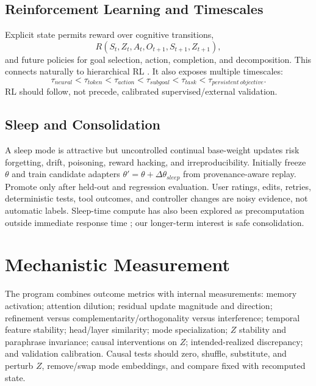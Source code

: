 \documentclass[11pt]{article}
\begin{document}
\subsection{Reinforcement Learning and Timescales}
Explicit state permits reward over cognitive transitions,
\begin{equation}
R(S_t,Z_t,A_t,O_{t+1},S_{t+1},Z_{t+1}),
\end{equation}
and future policies for goal selection, action, completion, and decomposition. This connects naturally to hierarchical RL \citep{sutton1999between}. It also exposes multiple timescales:
\begin{equation}
\tau_{neural}<\tau_{token}<\tau_{action}<\tau_{subgoal}<\tau_{task}<\tau_{persistent\ objective}.
\end{equation}
RL should follow, not precede, calibrated supervised/external validation.

\subsection{Sleep and Consolidation}
A sleep mode is attractive but uncontrolled continual base-weight updates risk forgetting, drift, poisoning, reward hacking, and irreproducibility. Initially freeze $\theta$ and train candidate adapters $\theta'=\theta+\Delta\theta_{sleep}$ from provenance-aware replay. Promote only after held-out and regression evaluation. User ratings, edits, retries, deterministic tests, tool outcomes, and controller changes are noisy evidence, not automatic labels. Sleep-time compute has also been explored as precomputation outside immediate response time \citep{snell2025sleeptime}; our longer-term interest is safe consolidation.

\section{Mechanistic Measurement}
The program combines outcome metrics with internal measurements: memory activation; attention dilution; residual update magnitude and direction; refinement versus complementarity/orthogonality versus interference; temporal feature stability; head/layer similarity; mode specialization; $Z$ stability and paraphrase invariance; causal interventions on $Z$; intended-realized discrepancy; and validation calibration. Causal tests should zero, shuffle, substitute, and perturb $Z$, remove/swap mode embeddings, and compare fixed with recomputed state.
\end{document}
